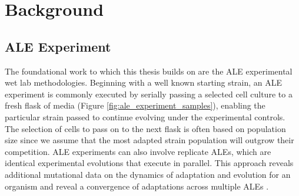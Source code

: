 \documentclass[12pt,final,masters,chapterheads]{ucsd}  %
\begin{document}
%
%

%
%

\section{Background}
\subsection{ALE Experiment}

%
%

%
%

The foundational work to which this thesis builds on are the ALE experimental wet lab methodologies. Beginning with a well known starting strain, an ALE experiment is commonly executed by serially passing a selected cell culture to a fresh flask of media (Figure \ref{fig:ale_experiment_samples}), enabling the particular strain passed to continue evolving under the experimental controls. The selection of cells to pass on to the next flask is often based on population size since we assume that the most adapted strain population will outgrow their competition. ALE experiments can also involve replicate ALEs, which are identical experimental evolutions that execute in parallel. This approach reveals additional mutational data on the dynamics of adaptation and evolution for an organism and reveal a convergence of adaptations across multiple ALEs \cite{sys_bio_book}.

\end{document}

